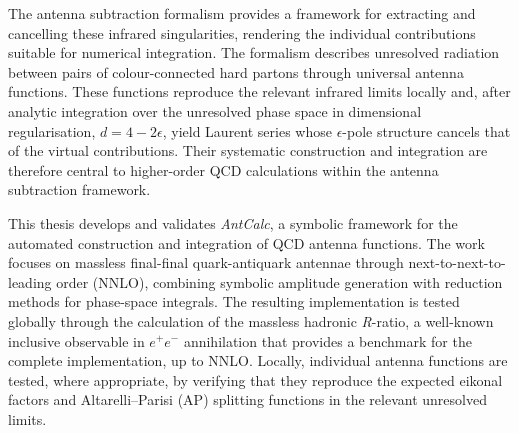 The antenna subtraction formalism provides a framework for extracting and cancelling
these infrared singularities, rendering the individual contributions suitable for
numerical integration. The formalism describes unresolved radiation between pairs of
colour-connected hard partons through universal antenna functions. These functions
reproduce the relevant infrared limits locally and, after analytic integration over the
unresolved phase space in dimensional regularisation, $d=4-2\epsilon$,
yield Laurent series whose $\epsilon$-pole structure cancels that of the
virtual contributions.
Their systematic construction and integration are therefore central to higher-order
QCD calculations within the antenna subtraction framework.

This thesis develops and validates \textit{AntCalc}, a symbolic framework for the 
automated construction and integration of QCD antenna functions. The work focuses 
on massless final-final quark-antiquark antennae through next-to-next-to-leading
order (NNLO), combining symbolic amplitude generation with reduction methods for 
phase-space integrals. The resulting implementation is tested globally through the calculation of the
massless hadronic \textit{R}-ratio, a well-known inclusive observable in $e^+e^-$
annihilation that provides a benchmark for the complete implementation, up to NNLO. Locally,
individual antenna functions are tested, where appropriate, by verifying that they
reproduce the expected eikonal factors and Altarelli--Parisi (AP) splitting functions
in the relevant unresolved limits. 

